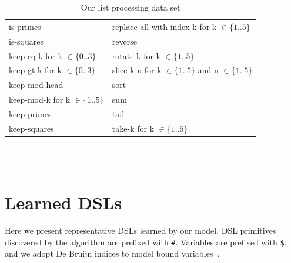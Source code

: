 \documentclass{article}
\begin{document}
\begin{table}[h]
\begin{tabular}{|l|l|}
    is-primes&
replace-all-with-index-k for k $\in\{1..5\}$\\
    is-squares&
reverse\\
    keep-eq-k for k $\in\{0..3\}$&
rotate-k for k $\in\{1..5\}$\\
    keep-gt-k for k $\in\{0..3\}$&
slice-k-n for k $\in\{1..5\}$ and n $\in\{1..5\}$\\
    keep-mod-head&
sort\\
    keep-mod-k for k $\in\{1..5\}$&
sum\\
    keep-primes&
tail\\
    keep-squares&
take-k for k $\in\{1..5\}$\\
\hline
  \end{tabular}
  \normalsize
  ~\\~\\\caption{Our list processing data set}\label{listdataset}
\end{table}

\section{Learned DSLs}

Here we present representative DSLs learned by our model. DSL primitives
discovered by the algorithm are prefixed with \lstinline!#!.
Variables are prefixed with \lstinline!$!, and we adopt De Bruijn indices to
model bound variables~\cite{pierce}.

\onecolumn

\end{document}
